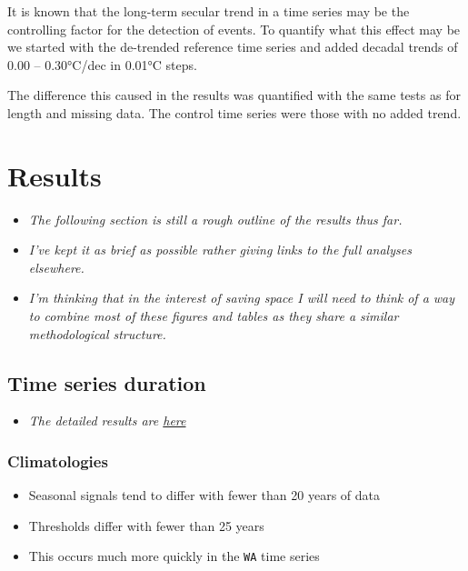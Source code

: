 \documentclass[]{article}
\providecommand{\tightlist}{%
  \setlength{\itemsep}{0pt}\setlength{\parskip}{0pt}}
\begin{document}
It is known that the long-term secular trend in a time series may be the
controlling factor for the detection of events. To quantify what this
effect may be we started with the de-trended reference time series and
added decadal trends of 0.00 -- 0.30°C/dec in 0.01°C steps.

The difference this caused in the results was quantified with the same
tests as for length and missing data. The control time series were those
with no added trend.

\section{Results}\label{results}

\begin{itemize}
\tightlist
\item
  \emph{The following section is still a rough outline of the results
  thus far.}
\item
  \emph{I've kept it as brief as possible rather giving links to the
  full analyses elsewhere.}
\item
  \emph{I'm thinking that in the interest of saving space I will need to
  think of a way to combine most of these figures and tables as they
  share a similar methodological structure.}
\end{itemize}

\subsection{Time series duration}\label{time-series-duration}

\begin{itemize}
\tightlist
\item
  \emph{The detailed results are
  \href{https://robwschlegel.github.io/MHWdetection/articles/time_series_duration.html}{here}}
\end{itemize}

\subsubsection{Climatologies}\label{climatologies}

\begin{itemize}
\tightlist
\item
  Seasonal signals tend to differ with fewer than 20 years of data
\item
  Thresholds differ with fewer than 25 years
\item
  This occurs much more quickly in the \texttt{WA} time series
\end{itemize}
\end{document}
